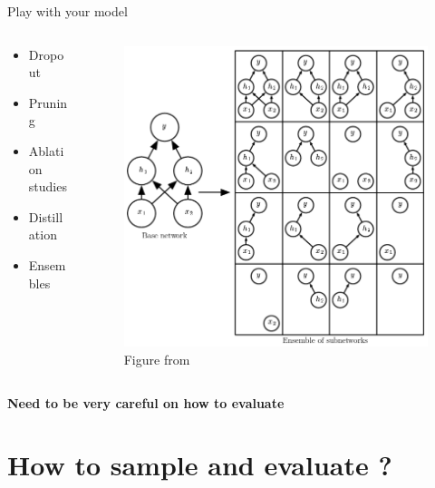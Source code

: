 \documentclass{irdbeamer}
\let\oldcite=\cite
\renewcommand{\cite}[1]{\textcolor[rgb]{.5,.5,.7}{\oldcite{#1}}}
\begin{document}
\begin{frame}{Play with your model}
    \begin{columns}
        \begin{column}{.5\linewidth}
            \begin{itemize}
                \item Dropout
                \item Pruning
                \item Ablation studies
                \item Distillation
                \item Ensembles
            \end{itemize}
        \end{column}
        \begin{column}{.5\linewidth}
            \begin{figure}
            \centering
    \includegraphics[width=.7\textwidth]{./figs/dropout.png}%
                \caption{\tiny Figure from \cite{goodfellow2016deep}}
            \end{figure}
        \end{column}
    \end{columns}
\end{frame}

\begin{frame}{}
    \centering
    \textbf{Need to be very careful on how to evaluate}
\end{frame}

\section{How to sample and evaluate ?}
\end{document}
